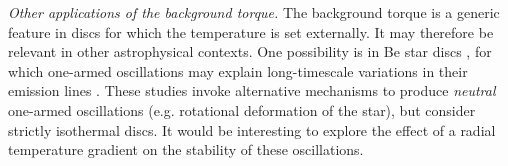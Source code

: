 \emph{Other applications of the background torque.}     
 The background torque is a generic feature in  
  discs for which the temperature is set externally.  It may therefore
  be relevant in other astrophysical contexts. 
One possibility is in Be star discs \citep{rivinius13}, 
for which one-armed oscillations may explain long-timescale variations
in their emission lines \citep[see e.g.][and references 
therein]{okasaki97,papaloizou06c,ogilvie08}. These studies 
invoke alternative mechanisms to produce \emph{neutral} one-armed
oscillations (e.g. rotational deformation of the star), but consider 
strictly isothermal discs. It would be interesting to explore
the effect of a radial temperature gradient on the stability of these
oscillations. 



